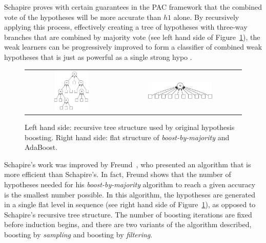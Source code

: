 Schapire proves with certain guarantees in the PAC framework that the combined vote of the hypotheses will be more accurate than $h1$ alone. By recursively applying this process, effectively creating a tree of hypotheses with three-way branches that are combined by majority vote (see left hand side of Figure~\ref{fig:boost_struct}), the weak learners can be progressively improved to form a classifier of combined weak hypotheses that is just as powerful as a single strong hypo \thesisc.

\begin{figure}
\centering
\begin{tabular}{c|c}
\includegraphics[width=0.40\textwidth]{figures/tree_boost} &
\includegraphics[width=0.55\textwidth]{figures/flat_boost} \\
\end{tabular}
\caption{Left hand side: recursive tree structure used by original hypothesis boosting. Right hand side: flat structure of {\em boost-by-majority} and AdaBoost.}
\label{fig:boost_struct}
\end{figure}

Schapire's work was improved by Freund~\cite{boostbymaj}, who presented an algorithm that is more efficient than Schapire's. In fact, Freund shows that the number of hypotheses needed for his {\em boost-by-majority} algorithm to reach a given accuracy is the smallest number possible. In this algorithm, the hypotheses are generated in a single flat level in sequence (see right hand side of Figure~\ref{fig:boost_struct}), as opposed to Schapire's recursive tree structure. The number of boosting iterations are fixed before induction begins, and there are two variants of the algorithm described, boosting by {\em sampling} and boosting by {\em filtering}.

